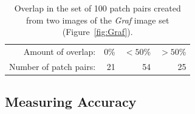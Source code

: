 \begin{table}[htb]
\caption{Overlap in the set of 100 patch pairs created from two images 
of the \emph{Graf} image set (Figure~\ref{fig:Graf}).}
\label{table:overlap}
    \centering
\begin{tabular}{r*{3}{r}}
\hline
    Amount of overlap: & 0\% & $< 50$\% & $> 50$\%  \\
    \noalign{\smallskip}
    Number of patch pairs: & 21 & 54 & 25 \\
    \hline
\end{tabular}
\end{table}

\subsection{Measuring Accuracy}

